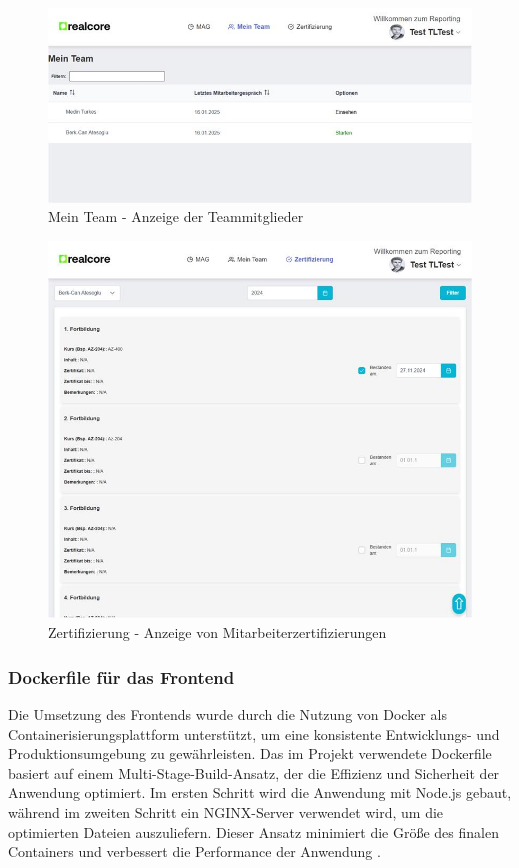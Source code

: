 \begin{figure}[H]
    \centering
    \includegraphics[width=1.2\textwidth]{images/meinteamview.jpg}
    \caption{Mein Team - Anzeige der Teammitglieder}
    \label{fig:data_entry}
\end{figure}

\begin{figure}[H]
    \centering
    \includegraphics[width=1.2\textwidth]{images/zertifikatview.jpg}
    \caption{Zertifizierung - Anzeige von Mitarbeiterzertifizierungen}
    \label{fig:settings}
\end{figure}


\subsubsection*{Dockerfile für das Frontend}
Die Umsetzung des Frontends wurde durch die Nutzung von Docker als Containerisierungsplattform unterstützt, um eine konsistente Entwicklungs- und Produktionsumgebung zu gewährleisten. Das im Projekt verwendete Dockerfile basiert auf einem Multi-Stage-Build-Ansatz, der die Effizienz und Sicherheit der Anwendung optimiert. Im ersten Schritt wird die Anwendung mit Node.js gebaut, während im zweiten Schritt ein NGINX-Server verwendet wird, um die optimierten Dateien auszuliefern. Dieser Ansatz minimiert die Größe des finalen Containers und verbessert die Performance der Anwendung \cite{docker2020mastery, docker2019production}.

